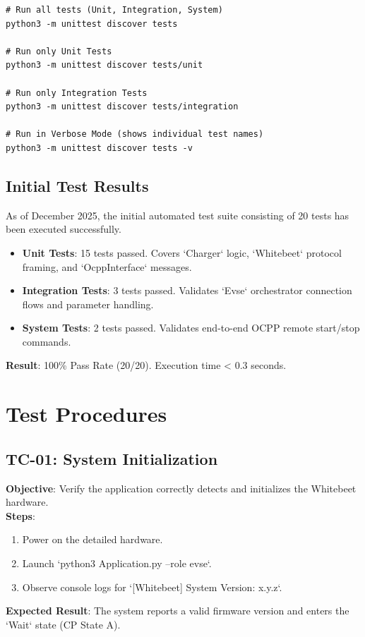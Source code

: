 \documentclass[a4paper,11pt]{report}
\begin{document}
\begin{verbatim}
# Run all tests (Unit, Integration, System)
python3 -m unittest discover tests

# Run only Unit Tests
python3 -m unittest discover tests/unit

# Run only Integration Tests
python3 -m unittest discover tests/integration

# Run in Verbose Mode (shows individual test names)
python3 -m unittest discover tests -v
\end{verbatim}

\subsection{Initial Test Results}
As of December 2025, the initial automated test suite consisting of 20 tests has been executed successfully.

\begin{itemize}
    \item \textbf{Unit Tests}: 15 tests passed. Covers `Charger` logic, `Whitebeet` protocol framing, and `OcppInterface` messages.
    \item \textbf{Integration Tests}: 3 tests passed. Validates `Evse` orchestrator connection flows and parameter handling.
    \item \textbf{System Tests}: 2 tests passed. Validates end-to-end OCPP remote start/stop commands.
\end{itemize}

\textbf{Result}: 100\% Pass Rate (20/20). Execution time < 0.3 seconds.

\section{Test Procedures}

\subsection{TC-01: System Initialization}
\textbf{Objective}: Verify the application correctly detects and initializes the Whitebeet hardware. \\
\textbf{Steps}:
\begin{enumerate}
    \item Power on the detailed hardware.
    \item Launch `python3 Application.py --role evse`.
    \item Observe console logs for `[Whitebeet] System Version: x.y.z`.
\end{enumerate}
\textbf{Expected Result}: The system reports a valid firmware version and enters the `Wait` state (CP State A).
\end{document}
